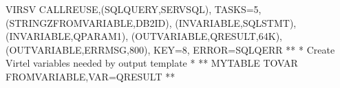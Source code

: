 \documentclass[letterpaper,10pt,english]{sphinxmanual}
\begin{document}
\begin{sphinxVerbatim}[commandchars=\\\{\}]
   VIRSV\PYGZdl{} CALL\PYGZhy{}REUSE,(\PYGZsq{}SQLQUERY\PYGZsq{},\PYGZsq{}SERVSQL\PYGZsq{}),                     \PYGZhy{}
         TASKS=5,                                                \PYGZhy{}
         (STRINGZ\PYGZhy{}FROM\PYGZhy{}VARIABLE,\PYGZsq{}DB2ID\PYGZsq{}),                        \PYGZhy{}
         (IN\PYGZhy{}VARIABLE,\PYGZsq{}SQLSTMT\PYGZsq{}),                                \PYGZhy{}
         (IN\PYGZhy{}VARIABLE,\PYGZsq{}QPARAM1\PYGZsq{}),                                \PYGZhy{}
         (OUT\PYGZhy{}VARIABLE,\PYGZsq{}QRESULT\PYGZsq{},64K),                           \PYGZhy{}
         (OUT\PYGZhy{}VARIABLE,\PYGZsq{}ERRMSG\PYGZsq{},800),                            \PYGZhy{}
         KEY=8,                                                  \PYGZhy{}
         ERROR=SQLQERR
*\PYGZhy{}\PYGZhy{}\PYGZhy{}\PYGZhy{}\PYGZhy{}\PYGZhy{}\PYGZhy{}\PYGZhy{}\PYGZhy{}\PYGZhy{}\PYGZhy{}\PYGZhy{}\PYGZhy{}\PYGZhy{}\PYGZhy{}\PYGZhy{}\PYGZhy{}\PYGZhy{}\PYGZhy{}\PYGZhy{}\PYGZhy{}\PYGZhy{}\PYGZhy{}\PYGZhy{}\PYGZhy{}\PYGZhy{}\PYGZhy{}\PYGZhy{}\PYGZhy{}\PYGZhy{}\PYGZhy{}\PYGZhy{}\PYGZhy{}\PYGZhy{}\PYGZhy{}\PYGZhy{}\PYGZhy{}\PYGZhy{}\PYGZhy{}\PYGZhy{}\PYGZhy{}\PYGZhy{}\PYGZhy{}\PYGZhy{}\PYGZhy{}\PYGZhy{}\PYGZhy{}\PYGZhy{}\PYGZhy{}\PYGZhy{}\PYGZhy{}\PYGZhy{}\PYGZhy{}\PYGZhy{}\PYGZhy{}\PYGZhy{}\PYGZhy{}\PYGZhy{}\PYGZhy{}\PYGZhy{}\PYGZhy{}\PYGZhy{}\PYGZhy{}\PYGZhy{}\PYGZhy{}\PYGZhy{}\PYGZhy{}\PYGZhy{}\PYGZhy{}*
* Create Virtel variables needed by output template                   *
*\PYGZhy{}\PYGZhy{}\PYGZhy{}\PYGZhy{}\PYGZhy{}\PYGZhy{}\PYGZhy{}\PYGZhy{}\PYGZhy{}\PYGZhy{}\PYGZhy{}\PYGZhy{}\PYGZhy{}\PYGZhy{}\PYGZhy{}\PYGZhy{}\PYGZhy{}\PYGZhy{}\PYGZhy{}\PYGZhy{}\PYGZhy{}\PYGZhy{}\PYGZhy{}\PYGZhy{}\PYGZhy{}\PYGZhy{}\PYGZhy{}\PYGZhy{}\PYGZhy{}\PYGZhy{}\PYGZhy{}\PYGZhy{}\PYGZhy{}\PYGZhy{}\PYGZhy{}\PYGZhy{}\PYGZhy{}\PYGZhy{}\PYGZhy{}\PYGZhy{}\PYGZhy{}\PYGZhy{}\PYGZhy{}\PYGZhy{}\PYGZhy{}\PYGZhy{}\PYGZhy{}\PYGZhy{}\PYGZhy{}\PYGZhy{}\PYGZhy{}\PYGZhy{}\PYGZhy{}\PYGZhy{}\PYGZhy{}\PYGZhy{}\PYGZhy{}\PYGZhy{}\PYGZhy{}\PYGZhy{}\PYGZhy{}\PYGZhy{}\PYGZhy{}\PYGZhy{}\PYGZhy{}\PYGZhy{}\PYGZhy{}\PYGZhy{}\PYGZhy{}*
MYTABLE  TOVAR\PYGZdl{} FROM\PYGZhy{}VARIABLE,VAR=\PYGZsq{}QRESULT\PYGZsq{}
*\PYGZhy{}\PYGZhy{}\PYGZhy{}\PYGZhy{}\PYGZhy{}\PYGZhy{}\PYGZhy{}\PYGZhy{}\PYGZhy{}\PYGZhy{}\PYGZhy{}\PYGZhy{}\PYGZhy{}\PYGZhy{}\PYGZhy{}\PYGZhy{}\PYGZhy{}\PYGZhy{}\PYGZhy{}\PYGZhy{}\PYGZhy{}\PYGZhy{}\PYGZhy{}\PYGZhy{}\PYGZhy{}\PYGZhy{}\PYGZhy{}\PYGZhy{}\PYGZhy{}\PYGZhy{}\PYGZhy{}\PYGZhy{}\PYGZhy{}\PYGZhy{}\PYGZhy{}\PYGZhy{}\PYGZhy{}\PYGZhy{}\PYGZhy{}\PYGZhy{}\PYGZhy{}\PYGZhy{}\PYGZhy{}\PYGZhy{}\PYGZhy{}\PYGZhy{}\PYGZhy{}\PYGZhy{}\PYGZhy{}\PYGZhy{}\PYGZhy{}\PYGZhy{}\PYGZhy{}\PYGZhy{}\PYGZhy{}\PYGZhy{}\PYGZhy{}\PYGZhy{}\PYGZhy{}\PYGZhy{}\PYGZhy{}\PYGZhy{}\PYGZhy{}\PYGZhy{}\PYGZhy{}\PYGZhy{}\PYGZhy{}\PYGZhy{}\PYGZhy{}*

\end{sphinxVerbatim}
\end{document}

